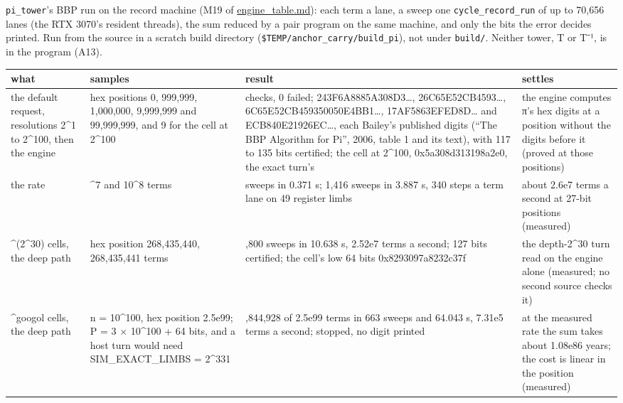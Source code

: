 \texttt{pi\_\allowbreak{}tower}'s BBP run on the record machine (M19 of \hyperref[chap:engine-table]{engine\_\allowbreak{}table.md}): each term a lane, a sweep one \texttt{cycle\_\allowbreak{}record\_\allowbreak{}run} of up to 70,656 lanes (the RTX 3070's resident threads), the sum reduced by a pair program on the same machine, and only the bits the error decides printed. Run from the source in a scratch build directory (\texttt{\$TEMP/\allowbreak{}anchor\_\allowbreak{}carry/\allowbreak{}build\_\allowbreak{}pi}), not under \texttt{build/\allowbreak{}}. Neither tower, T or T⁻¹, is in the program (A13).

{\footnotesize
\setlength{\tabcolsep}{6pt}
\begin{longtable}{>{\RaggedRight\arraybackslash}p{}>{\RaggedRight\arraybackslash}p{}>{\RaggedRight\arraybackslash}p{}>{\RaggedRight\arraybackslash}p{}}
\toprule
what & samples & result & settles \\
\midrule
\endhead
the default request, resolutions 2\textasciicircum{}1 to 2\textasciicircum{}100, then the engine & hex positions 0, 999,999, 1,000,000, 9,999,999 and 99,999,999, and 9 for the cell at 2\textasciicircum{}100 & 41 checks, 0 failed; 243F6A8885A308D3…, 26C65E52CB4593…, 6C65E52CB459350050E4BB1…, 17AF5863EFED8D… and ECB840E21926EC…, each Bailey's published digits (“The BBP Algorithm for Pi”, 2006, table 1 and its text), with 117 to 135 bits certified; the cell at 2\textasciicircum{}100, 0x5a308d313198a2e0, the exact turn's & the engine computes π's hex digits at a position without the digits before it (proved at those positions) \\
the rate & 10\textasciicircum{}7 and 10\textasciicircum{}8 terms & 142 sweeps in 0.371 s; 1,416 sweeps in 3.887 s, 340 steps a term lane on 49 register limbs & about 2.6e7 terms a second at 27-bit positions (measured) \\
2\textasciicircum{}(2\textasciicircum{}30) cells, the deep path & hex position 268,435,440, 268,435,441 terms & 3,800 sweeps in 10.638 s, 2.52e7 terms a second; 127 bits certified; the cell's low 64 bits 0x8293097a8232c37f & the depth-2\textasciicircum{}30 turn read on the engine alone (measured; no second source checks it) \\
2\textasciicircum{}googol cells, the deep path & n = 10\textasciicircum{}100, hex position 2.5e99; P = 3 × 10\textasciicircum{}100 + 64 bits, and a host turn would need SIM\_\allowbreak{}EXACT\_\allowbreak{}LIMBS = 2\textasciicircum{}331 & 46,844,928 of 2.5e99 terms in 663 sweeps and 64.043 s, 7.31e5 terms a second; stopped, no digit printed & at the measured rate the sum takes about 1.08e86 years; the cost is linear in the position (measured) \\

\end{longtable}}
